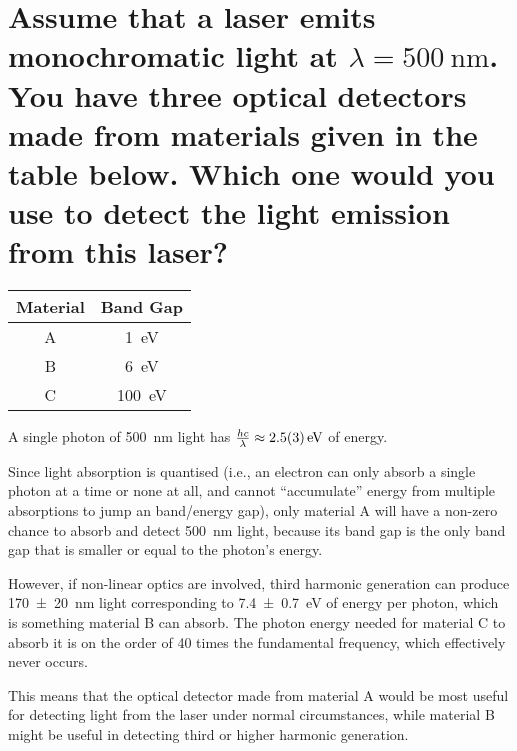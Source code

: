\documentclass[a4paper]{scrartcl}
\begin{document}
\section{Assume that a laser emits monochromatic light at \(\lambda = \SI{500}{\nano\metre}\). You have three optical detectors made from materials given in the table below. Which one would you use to detect the light emission from this laser?}
\begin{center}
    \begin{tabular}{c | c}
        Material & Band Gap \\
        \hline
        A & \SI{1}{\electronvolt} \\
        B & \SI{6}{\electronvolt} \\
        C & \SI{100}{\electronvolt} \\
        \hline
    \end{tabular}
\end{center}

A single photon of \SI{500}{\nano\metre} light has \(\frac{h c}{\lambda} \approx \SI{2.5 \pm 0.3}{\electronvolt}\) of energy.

Since light absorption is quantised (i.e., an electron can only absorb a single photon at a time or none at all, and cannot ``accumulate'' energy from multiple absorptions to jump an band/energy gap), only material A will have a non-zero chance to absorb and detect \SI{500}{\nano\metre} light, because its band gap is the only band gap that is smaller or equal to the photon's energy.

However, if non-linear optics are involved, third harmonic generation can produce \SI{170 \pm 20}{\nano\metre} light corresponding to \SI{7.4 \pm 0.7}{\electronvolt} of energy per photon, which is something material B can absorb. The photon energy needed for material C to absorb it is on the order of 40 times the fundamental frequency, which effectively never occurs.

This means that the optical detector made from material A would be most useful for detecting light from the laser under normal circumstances, while material B might be useful in detecting third or higher harmonic generation.
\end{document}
